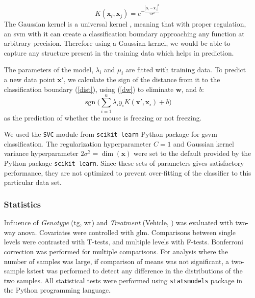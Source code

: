 \begin{equation*}
    K(\mathbf{x}_i, \mathbf{x}_j) = e^{-\frac{|\mathbf{x}_i - \mathbf{x}_j|^2}{2\sigma^2}}
\end{equation*}
The Gaussian kernel is a universal kernel \citep{park91}, meaning that with proper regulation, an \gls{svm} with it can create a classification boundary approaching any function at arbitrary precision. Therefore using a Gaussian kernel, we would be able to capture any structure present in the training data which helps in prediction.

The parameters of the model, $\lambda_i$ and $\mu_i$ are fitted with training data. To predict a new data point $\mathbf{x}'$, we calculate the sign of the distance from it to the classification boundary (\ref{dist}), using (\ref{dw}) to eliminate $\mathbf{w}$, and $b$:
\begin{equation*}
    \operatorname{sgn}\Big(\sum_{i=1}^n\lambda_iy_iK(\mathbf{x}', \mathbf{x}_i) + b\Big)
\end{equation*}
as the prediction of whether the mouse is freezing or not freezing.

We used the \texttt{SVC} module from \texttt{scikit-learn} Python package for \gls{gsvm} classification. The regularization hyperparameter $C=1$ and Gaussian kernel variance hyperparameter $2\sigma^2=\operatorname{dim}(\mathbf{x})$ were set to the default provided by the Python package \texttt{scikit-learn}. Since these sets of parameters gives satisfactory performance, they are not optimized to prevent over-fitting of the classifier to this particular data set.



\subsubsection{Statistics}

Influence of \textit{Genotype} (\gls{tg}, \gls{wt}) and \textit{Treatment} (Vehicle, \tglu{}) was evaluated with two-way \gls{anova}. Covariates were controlled with \gls{glm}. Comparisons between single levels were contrasted with T-tests, and multiple levels with F-tests. Bonferroni correction was performed for multiple comparisons. For analysis where the number of samples was large, if comparison of means was not significant, a two-sample \gls{kstest} was performed to detect any difference in the distributions of the two samples. All statistical tests were performed using \texttt{statsmodels} package in the Python programming language.

